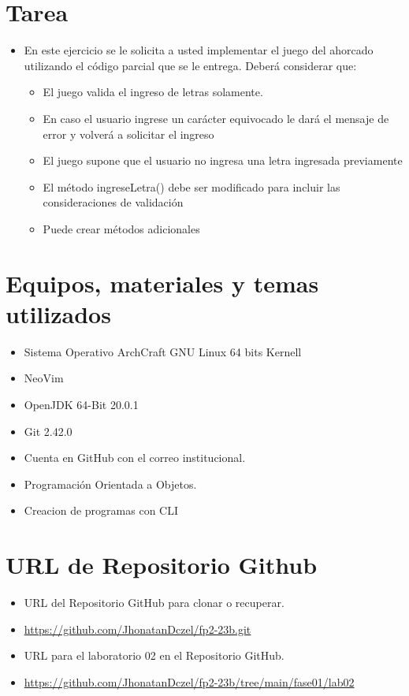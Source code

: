 \documentclass{article}
\begin{document}
	\section{Tarea}
	\begin{itemize}		
		\item En este ejercicio se le solicita a usted implementar el juego del ahorcado utilizando el código parcial que
se le entrega.
Deberá considerar que:
\begin{itemize}
    \item El juego valida el ingreso de letras solamente.
    \item  En caso el usuario ingrese un carácter equivocado le dará el mensaje de error y volverá a solicitar el ingreso
    \item El juego supone que el usuario no ingresa una letra ingresada previamente
    \item El método ingreseLetra() debe ser modificado para incluir las consideraciones de validación
    \item Puede crear métodos adicionales
\end{itemize}

	\end{itemize}
		
	\section{Equipos, materiales y temas utilizados}
	\begin{itemize}
		\item Sistema Operativo ArchCraft GNU Linux 64 bits Kernell
		\item NeoVim
		\item OpenJDK 64-Bit 20.0.1 
		\item Git 2.42.0
		\item Cuenta en GitHub con el correo institucional.
		\item Programación Orientada a Objetos.
		\item Creacion de programas con CLI	
	\end{itemize}
	
	\section{URL de Repositorio Github}
	\begin{itemize}
		\item URL del Repositorio GitHub para clonar o recuperar.
		\item \url{https://github.com/JhonatanDczel/fp2-23b.git}
		\item URL para el laboratorio 02 en el Repositorio GitHub.
		\item \url{https://github.com/JhonatanDczel/fp2-23b/tree/main/fase01/lab02}
	\end{itemize}
\end{document}
